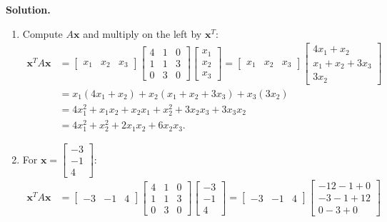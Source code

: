 \documentclass[11pt, letterpaper]{article}
\theoremstyle{definition}
\theoremstyle{remark}
\begin{document}
\textbf{Solution.}
\begin{enumerate}[label=\alph*.]
    \item Compute $A\mathbf{x}$ and multiply on the left by $\mathbf{x}^T$:
    \begin{align*}
    \mathbf{x}^T A \mathbf{x} &= \begin{bmatrix} x_1 & x_2 & x_3 \end{bmatrix} \begin{bmatrix} 4 & 1 & 0 \\ 1 & 1 & 3 \\ 0 & 3 & 0 \end{bmatrix} \begin{bmatrix} x_1 \\ x_2 \\ x_3 \end{bmatrix} = \begin{bmatrix} x_1 & x_2 & x_3 \end{bmatrix} \begin{bmatrix} 4x_1 + x_2 \\ x_1 + x_2 + 3x_3 \\ 3x_2 \end{bmatrix} \\
    &= x_1(4x_1 + x_2) + x_2(x_1 + x_2 + 3x_3) + x_3(3x_2) \\
    &= 4x_1^2 + x_1x_2 + x_2x_1 + x_2^2 + 3x_2x_3 + 3x_3x_2 \\
    &= 4x_1^2 + x_2^2 + 2x_1x_2 + 6x_2x_3.
    \end{align*}
    \item For $\mathbf{x} = \begin{bmatrix} -3 \\ -1 \\ 4 \end{bmatrix}$:
    \begin{align*}
    \mathbf{x}^T A \mathbf{x} &= \begin{bmatrix} -3 & -1 & 4 \end{bmatrix} \begin{bmatrix} 4 & 1 & 0 \\ 1 & 1 & 3 \\ 0 & 3 & 0 \end{bmatrix} \begin{bmatrix} -3 \\ -1 \\ 4 \end{bmatrix} = \begin{bmatrix} -3 & -1 & 4 \end{bmatrix} \begin{bmatrix} -12 - 1 + 0 \\ -3 - 1 + 12 \\ 0 - 3 + 0 \end{bmatrix} \\

\end{align*}
\end{enumerate}
\end{document}
